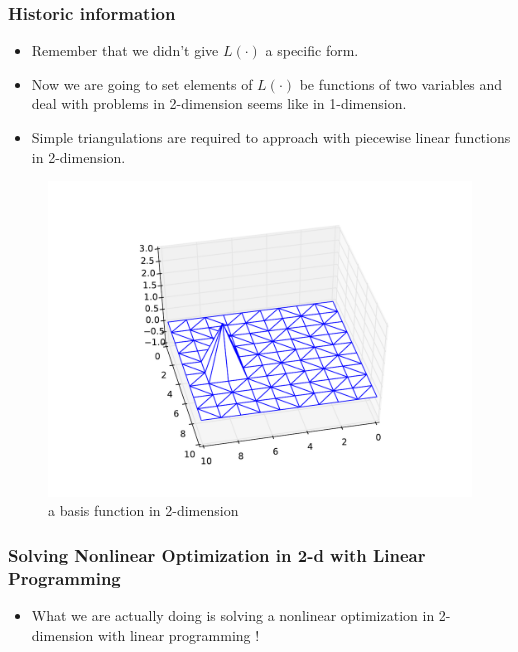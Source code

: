 \documentclass{beamer}
\begin{document}
\begin{frame}
\frametitle{Historic information}
\begin{itemize}
\item
Remember that we didn't give $L(\cdot)$ a specific form. 
\item
Now we are going to set elements of $L(\cdot)$ be functions of two variables and deal with problems in 2-dimension seems like in 1-dimension.
\item
Simple triangulations are required to approach with piecewise linear functions in 2-dimension.
\end{itemize}
\begin{figure}
\centering
\includegraphics[width=.5\textwidth]{basis_3.pdf}
\caption{a basis function in 2-dimension}
\end{figure}
\end{frame}

\begin{frame}
\frametitle{Solving Nonlinear Optimization in 2-d with Linear Programming}
\begin{itemize}
\item What we are actually doing is solving a nonlinear optimization in 2-dimension with linear programming !
\end{itemize}
\end{frame}
\end{document}
